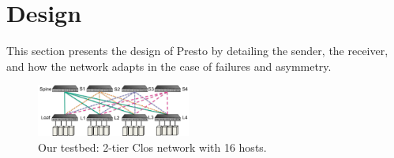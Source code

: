 \section{Design}
\label{sec:design}

This section presents the design of Presto by detailing
the sender, the receiver, and how the network
adapts in the case of failures and asymmetry.


%
%
%
%
%
%
%

\begin{figure}[!t]
        \centering
  \includegraphics[width=0.45\textwidth,height=0.17\textwidth]{./figures/macro/macro_evaluation_topology_refined.pdf}
        \caption{Our testbed: 2-tier Clos network with 16 hosts.}
        \label{macro_evaluation_topology}
\end{figure}

